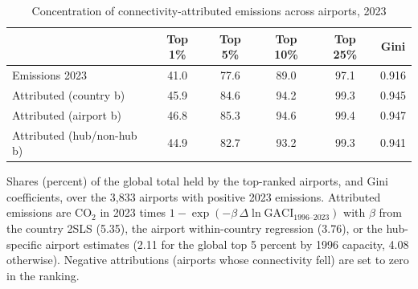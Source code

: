 \begin{table}[htbp]
\centering
\begin{threeparttable}
\caption{Concentration of connectivity-attributed emissions across airports, 2023}
\label{tab:airport_conc}
\footnotesize
\begin{tabular}{lccccc}
\toprule
 & Top 1\% & Top 5\% & Top 10\% & Top 25\% & Gini \\
\midrule
  Emissions 2023 & 41.0 & 77.6 & 89.0 & 97.1 & 0.916 \\
  Attributed (country b) & 45.9 & 84.6 & 94.2 & 99.3 & 0.945 \\
  Attributed (airport b) & 46.8 & 85.3 & 94.6 & 99.4 & 0.947 \\
  Attributed (hub/non-hub b) & 44.9 & 82.7 & 93.2 & 99.3 & 0.941 \\
\bottomrule
\end{tabular}
\begin{tablenotes}\footnotesize
\item Shares (percent) of the global total held by the top-ranked airports, and Gini coefficients, over the 3,833 airports with positive 2023 emissions. Attributed emissions are CO$_2$ in 2023 times $1-\exp(-\beta\,\Delta\ln \mathrm{GACI}_{1996\text{--}2023})$ with $\beta$ from the country 2SLS (5.35), the airport within-country regression (3.76), or the hub-specific airport estimates (2.11 for the global top 5 percent by 1996 capacity, 4.08 otherwise). Negative attributions (airports whose connectivity fell) are set to zero in the ranking.
\end{tablenotes}
\end{threeparttable}
\end{table}
